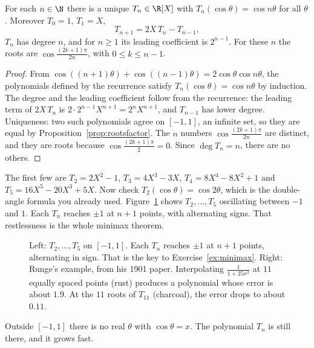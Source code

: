 \begin{proposition}\label{prop:cheb}
For each $n\in\N$ there is a unique $T_n\in\R[X]$ with $T_n(\cos\theta)=\cos n\theta$ for all $\theta$. Moreover $T_0=1$, $T_1=X$,
\[
T_{n+1}=2X\,T_n-T_{n-1},
\]
$T_n$ has degree $n$, and for $n\ge1$ its leading coefficient is $2^{n-1}$. For these $n$ the roots are $\cos\frac{(2k+1)\pi}{2n}$, with $0\le k\le n-1$.
\end{proposition}
\begin{proof}
From $\cos((n+1)\theta)+\cos((n-1)\theta)=2\cos\theta\cos n\theta$, the polynomials defined by the recurrence satisfy $T_n(\cos\theta)=\cos n\theta$ by induction. The degree and the leading coefficient follow from the recurrence: the leading term of $2X\,T_n$ is $2\cdot2^{n-1}X^{n+1}=2^nX^{n+1}$, and $T_{n-1}$ has lower degree. Uniqueness: two such polynomials agree on $[-1,1]$, an infinite set, so they are equal by Proposition~\ref{prop:rootsfactor}. The $n$ numbers $\cos\frac{(2k+1)\pi}{2n}$ are distinct, and they are roots because $\cos\frac{(2k+1)\pi}2=0$. Since $\deg T_n=n$, there are no others.
\end{proof}

The first few are $T_2=2X^2-1$, $T_3=4X^3-3X$, $T_4=8X^4-8X^2+1$ and $T_5=16X^5-20X^3+5X$. Now check $T_2(\cos\theta)=\cos2\theta$, which is the double-angle formula you already used. Figure~\ref{fig:chebyshev} shows $T_2,\dots,T_5$ oscillating between $-1$ and $1$. Each $T_n$ reaches $\pm1$ at $n+1$ points, with alternating signs. That restlessness is the whole minimax theorem.

\begin{figure}[ht]
\centering
{}
\caption{Left: $T_2,\dots,T_5$ on $[-1,1]$. Each $T_n$ reaches $\pm1$ at $n+1$ points, alternating in sign. That is the key to Exercise~\ref{ex:minimax}. Right: Runge's example, from his 1901 paper. Interpolating $\frac1{1+25x^2}$ at $11$ equally spaced points (rust) produces a polynomial whose error is about $1.9$. At the $11$ roots of $T_{11}$ (charcoal), the error drops to about $0.11$.}
\label{fig:chebyshev}
\end{figure}

Outside $[-1,1]$ there is no real $\theta$ with $\cos\theta=x$. The polynomial $T_n$ is still there, and it grows fast.


